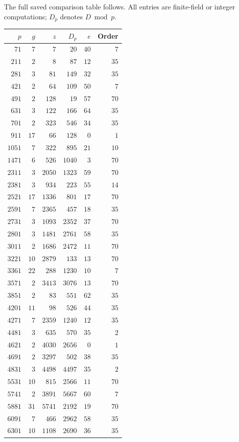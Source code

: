 \documentclass[11pt]{article}
\begin{document}
The full saved comparison table follows. All entries are finite-field or
integer computations; $D_p$ denotes $D\bmod p$.

\begingroup\small

\begin{longtable}{rrrrrr}
\toprule
$p$ & $g$ & $z$ & $D_p$ & $e$ & Order\\
\midrule
\endhead
$71$ & $7$ & $7$ & $20$ & $40$ & $7$\\
$211$ & $2$ & $8$ & $87$ & $12$ & $35$\\
$281$ & $3$ & $81$ & $149$ & $32$ & $35$\\
$421$ & $2$ & $64$ & $109$ & $50$ & $7$\\
$491$ & $2$ & $128$ & $19$ & $57$ & $70$\\
$631$ & $3$ & $122$ & $166$ & $64$ & $35$\\
$701$ & $2$ & $323$ & $546$ & $34$ & $35$\\
$911$ & $17$ & $66$ & $128$ & $0$ & $1$\\
$1051$ & $7$ & $322$ & $895$ & $21$ & $10$\\
$1471$ & $6$ & $526$ & $1040$ & $3$ & $70$\\
$2311$ & $3$ & $2050$ & $1323$ & $59$ & $70$\\
$2381$ & $3$ & $934$ & $223$ & $55$ & $14$\\
$2521$ & $17$ & $1336$ & $801$ & $17$ & $70$\\
$2591$ & $7$ & $2365$ & $457$ & $18$ & $35$\\
$2731$ & $3$ & $1093$ & $2352$ & $37$ & $70$\\
$2801$ & $3$ & $1481$ & $2761$ & $58$ & $35$\\
$3011$ & $2$ & $1686$ & $2472$ & $11$ & $70$\\
$3221$ & $10$ & $2879$ & $133$ & $13$ & $70$\\
$3361$ & $22$ & $288$ & $1230$ & $10$ & $7$\\
$3571$ & $2$ & $3413$ & $3076$ & $13$ & $70$\\
$3851$ & $2$ & $83$ & $551$ & $62$ & $35$\\
$4201$ & $11$ & $98$ & $526$ & $44$ & $35$\\
$4271$ & $7$ & $2359$ & $1240$ & $12$ & $35$\\
$4481$ & $3$ & $635$ & $570$ & $35$ & $2$\\
$4621$ & $2$ & $4030$ & $2656$ & $0$ & $1$\\
$4691$ & $2$ & $3297$ & $502$ & $38$ & $35$\\
$4831$ & $3$ & $4498$ & $4497$ & $35$ & $2$\\
$5531$ & $10$ & $815$ & $2566$ & $11$ & $70$\\
$5741$ & $2$ & $3891$ & $5667$ & $60$ & $7$\\
$5881$ & $31$ & $5741$ & $2192$ & $19$ & $70$\\
$6091$ & $7$ & $466$ & $2962$ & $58$ & $35$\\
$6301$ & $10$ & $1108$ & $2690$ & $36$ & $35$\\
\bottomrule
\end{longtable}
\end{document}
